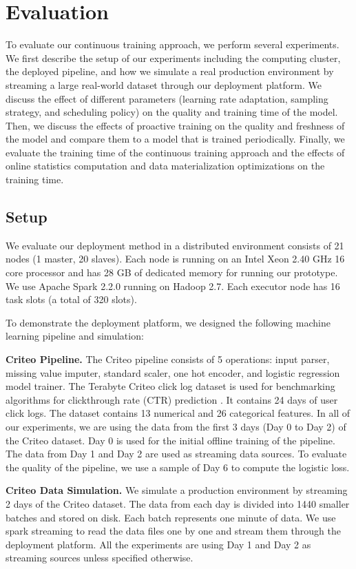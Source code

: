 \section{Evaluation} \label{evaluation} 
To evaluate our continuous training approach, we perform several experiments.
We first describe the setup of our experiments including the computing cluster, the deployed pipeline, and how we simulate a real production environment by streaming a large real-world  dataset through our deployment platform.
We discuss the effect of different parameters (learning rate adaptation, sampling strategy, and scheduling policy) on the quality and training time of the model.
Then, we discuss the effects of proactive training on the quality and freshness of the model and compare them to a model that is trained periodically.
Finally, we evaluate the training time of the continuous training approach and the effects of online statistics computation and data materialization optimizations on the training time.

\subsection{Setup}\label{subsec:setup}
We evaluate our deployment method in a distributed environment consists of 21 nodes (1 master, 20 slaves).
Each node is running on an Intel Xeon 2.40 GHz 16 core processor and has 28 GB of dedicated memory for running our prototype.
We use Apache Spark 2.2.0 running on Hadoop 2.7.
Each executor node has 16 task slots (a total of 320 slots).

To demonstrate the deployment platform, we designed the following machine learning pipeline and simulation:

\textbf{Criteo Pipeline.} 
The Criteo pipeline consists of 5 operations: input parser, missing value imputer, standard scaler, one hot encoder, and logistic regression model trainer. 
The Terabyte Criteo click log dataset is used for benchmarking algorithms for clickthrough rate (CTR) prediction \cite{criteo-log}.
It contains 24 days of user click logs. 
The dataset contains 13 numerical and 26 categorical features. 
In all of our experiments, we are using the data from the first 3 days (Day 0 to Day 2) of the Criteo dataset.
Day 0 is used for the initial offline training of the pipeline.
The data from Day 1 and Day 2 are used as streaming data sources.
To evaluate the quality of the pipeline, we use a sample of Day 6 to compute the logistic loss.

\textbf{Criteo Data Simulation.}
We simulate a production environment by streaming 2 days of the Criteo dataset.
The data from each day is divided into 1440 smaller batches and stored on disk.
Each batch represents one minute of data.
We use spark streaming to read the data files one by one and stream them through the deployment platform. 
All the experiments are using Day 1 and Day 2 as streaming sources unless specified otherwise.

